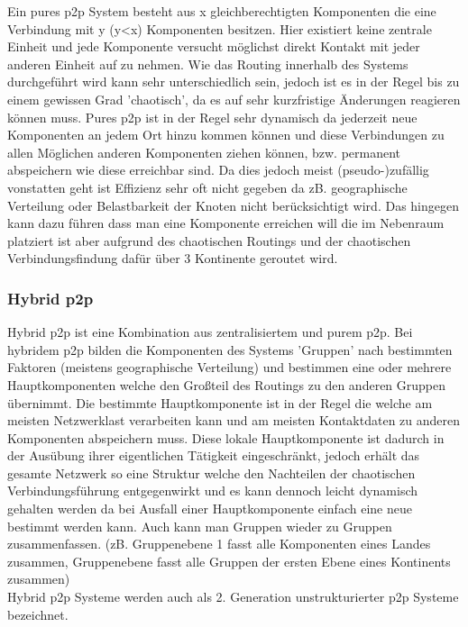 \documentclass[a4paper,12pt]{scrreprt}
\begin{document}
					Ein pures p2p System besteht aus x gleichberechtigten Komponenten die eine Verbindung mit y (y<x) Komponenten besitzen. Hier existiert keine zentrale Einheit und jede Komponente versucht möglichst direkt Kontakt mit jeder anderen Einheit auf zu nehmen. Wie das Routing innerhalb des Systems durchgeführt wird kann sehr unterschiedlich sein, jedoch ist es in der Regel bis zu einem gewissen Grad 'chaotisch', da es auf sehr kurzfristige Änderungen reagieren können muss. Pures p2p ist in der Regel sehr dynamisch da jederzeit neue Komponenten an jedem Ort hinzu kommen können und diese Verbindungen zu allen Möglichen anderen Komponenten ziehen können, bzw. permanent abspeichern wie diese erreichbar sind. Da dies jedoch meist (pseudo-)zufällig vonstatten geht ist Effizienz sehr oft nicht gegeben da zB. geographische Verteilung oder Belastbarkeit der Knoten nicht berücksichtigt wird. Das hingegen kann dazu führen dass man eine Komponente erreichen will die im Nebenraum platziert ist aber aufgrund des chaotischen Routings und der chaotischen Verbindungsfindung dafür über 3 Kontinente geroutet wird.
					
				\subsubsection{Hybrid p2p}
				
					Hybrid p2p ist eine Kombination aus zentralisiertem und purem p2p. Bei hybridem p2p bilden die Komponenten des Systems 'Gruppen' nach bestimmten Faktoren (meistens geographische Verteilung) und bestimmen eine oder mehrere Hauptkomponenten welche den Großteil des Routings zu den anderen Gruppen übernimmt. Die bestimmte Hauptkomponente ist in der Regel die welche am meisten Netzwerklast verarbeiten kann und am meisten Kontaktdaten zu anderen Komponenten abspeichern muss. Diese lokale Hauptkomponente ist dadurch in der Ausübung ihrer eigentlichen Tätigkeit eingeschränkt, jedoch erhält das gesamte Netzwerk so eine Struktur welche den Nachteilen der chaotischen Verbindungsführung entgegenwirkt und es kann dennoch leicht dynamisch gehalten werden da bei Ausfall einer Hauptkomponente einfach eine neue bestimmt werden kann. Auch kann man Gruppen wieder zu Gruppen zusammenfassen. (zB. Gruppenebene 1 fasst alle Komponenten eines Landes zusammen, Gruppenebene fasst alle Gruppen der ersten Ebene eines Kontinents zusammen)\\
					Hybrid p2p Systeme werden auch als 2. Generation unstrukturierter p2p Systeme bezeichnet.
					
\end{document}
